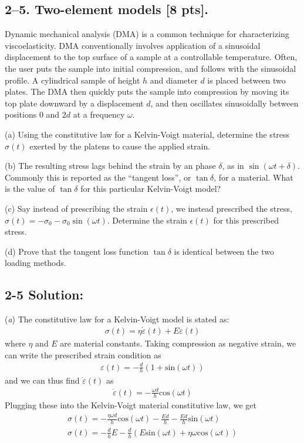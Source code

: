 \bigskip
\subsection*{2--5. \textbf{Two-element models} [8 pts].}

Dynamic mechanical analysis (DMA) is a common technique for characterizing viscoelasticity. 
DMA conventionally involves application of a sinusoidal displacement to the top surface of a sample at a controllable temperature. 
Often, the user puts the sample into initial compression, and follows with the sinusoidal profile. 
A cylindrical sample of height $h$ and diameter $d$ is placed between two plates.
The DMA then quickly puts the sample into compression by moving its top plate downward by a displacement $d$, and then oscillates sinusoidally between positions $0$ and $2d$ at a frequency $\omega$.

\medskip
(a) Using the constitutive law for a Kelvin-Voigt material, determine the stress $\sigma(t)$ exerted by the platens to cause the applied strain. 

\medskip
(b) The resulting stress lags behind the strain by an phase $\delta$, as in $\sin(\omega t + \delta)$. 
Commonly this is reported as the ``tangent loss'', or $\tan\delta$, for a material. 
What is the value of $\tan\delta$ for this particular Kelvin-Voigt model?

\medskip
(c) Say instead of prescribing the strain $\epsilon(t)$, we instead prescribed the stress, $\sigma(t) = - \sigma_0 - \sigma_0 \sin(\omega t)$. 
Determine the strain $\epsilon(t)$ for this prescribed stress.

\medskip
(d) Prove that the tangent loss function $\tan\delta$ is identical between the two loading methods.

\subsection*{\textbf{2-5 Solution:}}
(\textit{a}) The constitutive law for a Kelvin-Voigt model is stated as:
\begin{gather*}
    \sigma(t)=\eta\dot{\varepsilon}(t)+E\varepsilon(t)
\end{gather*}
where $\eta$ and $E$ are material constants. Taking compression as negative strain, we can write the prescribed strain condition as
\begin{gather*}
    \varepsilon(t)=-\frac{d}{h}(1+\text{sin}(\omega t))
\end{gather*}
and we can thus find $\dot{\varepsilon}(t)$ as
\begin{gather*}
    \dot{\varepsilon}(t)=-\frac{\omega d}{h}\text{cos}(\omega t)
\end{gather*}
Plugging these into the Kelvin-Voigt material constitutive law, we get
\begin{gather*}
    \sigma(t)=-\frac{\eta\omega d}{h}\text{cos}(\omega t)-\frac{Ed}{h}-\frac{Ed}{h}\text{sin}(\omega t)\\
    \sigma(t)=-\frac{d}{h}E-\frac{d}{h}(E\text{sin}(\omega t)+\eta\omega\text{cos}(\omega t))
\end{gather*}

